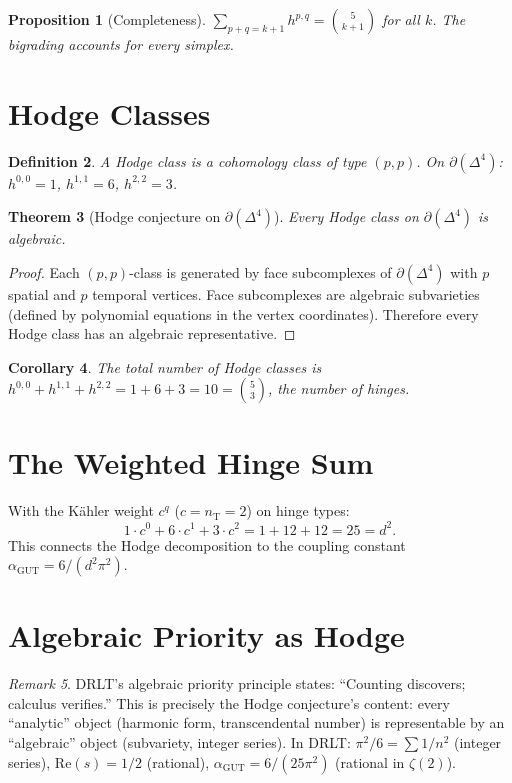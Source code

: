 \documentclass[12pt]{article}
\newtheorem{theorem}{Theorem}[section]
\newtheorem{corollary}[theorem]{Corollary}
\newtheorem{proposition}[theorem]{Proposition}
\newtheorem{definition}[theorem]{Definition}
\theoremstyle{remark}
\newtheorem{remark}[theorem]{Remark}
\newcommand{\nT}{n_{\mathrm{T}}}
\begin{document}
\begin{proposition}[Completeness]
$\sum_{p+q = k+1} h^{p,q} = \binom{5}{k+1}$ for all $k$.
The bigrading accounts for every simplex.
\end{proposition}

\section{Hodge Classes}

\begin{definition}
A Hodge class is a cohomology class of type $(p,p)$.
On $\partial(\Delta^4)$: $h^{0,0} = 1$, $h^{1,1} = 6$,
$h^{2,2} = 3$.
\end{definition}

\begin{theorem}[Hodge conjecture on $\partial(\Delta^4)$]
\label{thm:hodge}
Every Hodge class on $\partial(\Delta^4)$ is algebraic.
\end{theorem}

\begin{proof}
Each $(p,p)$-class is generated by face subcomplexes of
$\partial(\Delta^4)$ with $p$ spatial and $p$ temporal
vertices. Face subcomplexes are algebraic subvarieties
(defined by polynomial equations in the vertex coordinates).
Therefore every Hodge class has an algebraic representative.
\end{proof}

\begin{corollary}
The total number of Hodge classes is
$h^{0,0} + h^{1,1} + h^{2,2} = 1 + 6 + 3 = 10
= \binom{5}{3}$, the number of hinges.
\end{corollary}

\section{The Weighted Hinge Sum}

With the K\"ahler weight $c^q$ ($c = \nT = 2$) on
hinge types:
\[
  1 \cdot c^0 + 6 \cdot c^1 + 3 \cdot c^2
  = 1 + 12 + 12 = 25 = d^2.
\]
This connects the Hodge decomposition to the coupling
constant $\alpha_{\mathrm{GUT}} = 6/(d^2 \pi^2)$.

\section{Algebraic Priority as Hodge}

\begin{remark}
DRLT's algebraic priority principle states:
``Counting discovers; calculus verifies.'' This is
precisely the Hodge conjecture's content: every
``analytic'' object (harmonic form, transcendental number)
is representable by an ``algebraic'' object (subvariety,
integer series). In DRLT: $\pi^2/6 = \sum 1/n^2$
(integer series), $\mathrm{Re}(s) = 1/2$ (rational),
$\alpha_{\mathrm{GUT}} = 6/(25\pi^2)$ (rational in $\zeta(2)$).
\end{remark}
\end{document}
